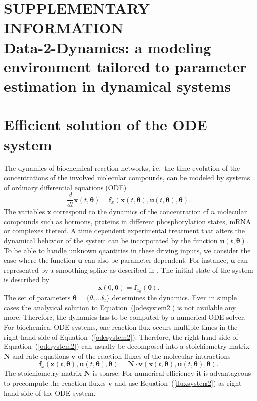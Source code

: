 \documentclass[12pt,a4paper]{scrartcl}
\newcommand{\DD}[2]{\frac{d #1}{d #2}}
\begin{document}
\section*{SUPPLEMENTARY INFORMATION\\Data-2-Dynamics: a modeling environment tailored to 
parameter estimation in dynamical systems}

\renewcommand*\contentsname{Contents}
\tableofcontents

\section{Efficient solution of the ODE system} \label{sec:ode_solvers}
The dynamics of biochemical reaction networks, i.e.~the time evolution of the concentra\-tions of the 
involved molecular compounds, can be modeled by systems of ordinary differential equations (ODE)
\begin{equation}
	\DD{}{t}{\mathbf{x}}(t, \boldsymbol{\theta}) = \mathbf{f}_{x}(\mathbf{x}(t, \boldsymbol{\theta}), 
\mathbf{u}(t, \boldsymbol{\theta}), \boldsymbol{\theta}). \label{odesystem2}
\end{equation}
The variables $\mathbf{x}$ correspond to the dynamics of the concentration of $n$ molecular compounds 
such as hormons, proteins in different phosphorylation states, mRNA or complexes thereof. A time 
dependent experimental treatment that alters the dynamical behavior of the system can be incorporated by 
the function $\mathbf{u}(t, \boldsymbol{\theta})$. To be able to handle unknown quantities in these driving 
inputs, we consider the case where the function $\mathbf{u}$ can also be parameter dependent. For 
instance, $\mathbf{u}$ can represented by a smoothing spline as described in \citet{Schelker:2012uq}. The 
initial state of the system is described by 
\begin{equation}
	\mathbf{x}(0, \boldsymbol{\theta}) = \mathbf{f}_{x_0}(\boldsymbol{\theta}). \label{init_ode_sys}
\end{equation}	
The set of parameters $\boldsymbol{\theta} = \{\theta_1 \dots \theta_l\}$ determines the  dynamics. Even in 
simple cases the analytical solution to Equation~(\ref{odesystem2}) is not available any more. Therefore, 
the dynamics has to be computed by a numerical ODE solver. For biochemical ODE systems, one reaction 
flux occurs multiple times in the right hand side of Equation~(\ref{odesystem2}). Therefore, the right hand 
side of Equation~(\ref{odesystem2}) can usually be decomposed into a stoichiometry matrix $\mathbf{N}$ 
and rate equations $\mathbf{v}$ of the reaction fluxes of the molecular interactions
\begin{equation}
	\mathbf{f}_{x}(\mathbf{x}(t, \boldsymbol{\theta}), \mathbf{u}(t, \boldsymbol{\theta}), \boldsymbol{\theta}) 
= \mathbf{N} \cdot \mathbf{v}(\mathbf{x}(t, \boldsymbol{\theta}), \mathbf{u}(t, \boldsymbol{\theta}), 
\boldsymbol{\theta}). \label{fluxsystem2}
\end{equation}
The stoichiometry matrix $\mathbf{N}$ is sparse. For numerical efficiency it is advantageous to precompute 
the reaction fluxes $\mathbf{v}$ and use Equation~(\ref{fluxsystem2}) as right hand side of the ODE 
system. 
\end{document}
